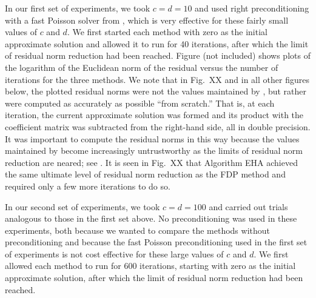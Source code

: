 In our first set of experiments, we took $c=d=10$ and used right 
preconditioning with a fast Poisson solver from {\fishpack}  
\cite{Santella.DeCarlo-2004}, which is very effective for these  
fairly small values of $c$ and $d$. We first started each method 
with zero as the initial approximate solution and allowed it  
to run for 40 {\gmresm} iterations, after which the limit of residual  
norm reduction had been reached. Figure (not included) shows plots  
of the logarithm of the Euclidean norm of the residual versus  
the number of {\gmresm} iterations for the three methods. We note
that in  Fig.~XX and in all other figures below, the plotted
residual norms were not the values maintained by {\gmresm}, but rather
were computed as accurately as possible ``from scratch.''  That is, 
at each {\gmresm} iteration, the current approximate solution was 
formed and its product with the coefficient matrix was subtracted 
from the right-hand side, all in double precision.  
It was important to compute the residual norms in this way because  
the values maintained by {\gmresm} become increasingly untrustworthy  
as the limits of residual norm reduction are neared; see \cite{Grayson-1987}.  
It is seen in Fig.~XX 
that Algorithm EHA achieved  
the same ultimate level of residual norm reduction as the FDP  
method and required only a few more {\gmresm} iterations to do
so.

In our second set of experiments, we took $c=d=100$ and carried out  
trials analogous to those in the first set above. No preconditioning  
was used in these experiments, both because we wanted to compare 
the methods without preconditioning and because the fast  
Poisson preconditioning used in the first set of experiments is 
not cost effective for these large values of $c$ and $d$. We first  
allowed each method to run for 600 {\gmresm} iterations, 
starting with zero as the initial approximate solution, after which  
the limit of residual norm reduction had been reached.
